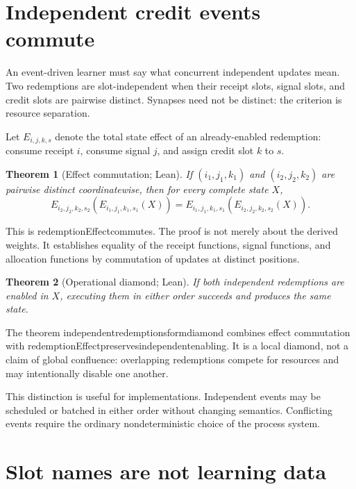 \documentclass[11pt]{article}
\newtheorem{theorem}{Theorem}[section]
\newcommand{\leanname}[1]{{\scriptsize\ttfamily
  \def\_{\textunderscore\allowbreak}#1}}
\begin{document}
\section{Independent credit events commute}
\label{sec:diamond}

An event-driven learner must say what concurrent independent updates mean.
Two redemptions are slot-independent when their receipt slots, signal slots,
and credit slots are pairwise distinct.  Synapses need not be distinct: the
criterion is resource separation.

Let $E_{i,j,k,s}$ denote the total state effect of an already-enabled
redemption: consume receipt $i$, consume signal $j$, and assign credit slot
$k$ to $s$.

\begin{theorem}[Effect commutation; Lean]
If $(i_1,j_1,k_1)$ and $(i_2,j_2,k_2)$ are pairwise distinct coordinatewise,
then for every complete state $X$,
\[
 E_{i_2,j_2,k_2,s_2}(E_{i_1,j_1,k_1,s_1}(X))
 =
 E_{i_1,j_1,k_1,s_1}(E_{i_2,j_2,k_2,s_2}(X)).
\]
\end{theorem}

This is \leanname{redemptionEffect\_commutes}.  The proof is not merely about
the derived weights.  It establishes equality of the receipt functions,
signal functions, and allocation functions by commutation of updates at
distinct positions.

\begin{theorem}[Operational diamond; Lean]
If both independent redemptions are enabled in $X$, executing them in either
order succeeds and produces the same state.
\end{theorem}

The theorem \leanname{independent\_redemptions\_form\_diamond} combines effect
commutation with
\leanname{redemptionEffect\_preserves\_independent\_enabling}.  It is a local
diamond, not a claim of global confluence: overlapping redemptions compete for
resources and may intentionally disable one another.

This distinction is useful for implementations.  Independent events may be
scheduled or batched in either order without changing semantics.  Conflicting
events require the ordinary nondeterministic choice of the process system.

\section{Slot names are not learning data}
\label{sec:symmetry}
\end{document}

